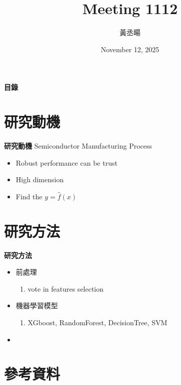 \documentclass[12pt,aspectratio=43]{beamer}
\title{Meeting 1112}
\author{黃丞暘}
\institute{國立東華大學應數統計所}
\date{November 12, 2025}
\begin{document}
\begin{frame}
  \titlepage
\end{frame}

\begin{frame}{\textbf{目錄}}
  \tableofcontents
\end{frame}

\section{研究動機}

\begin{frame}{\textbf{研究動機}}
\linespread{1.5}
  Semiconductor Manufacturing Process
  \begin{itemize}
    \item Robust performance can be trust
  \end{itemize}
  \begin{itemize}
    \item High dimension
  \end{itemize}
  \begin{itemize}
    \item Find the $y = \hat{f}(x)$
  \end{itemize}
\end{frame}

\section{研究方法}
\begin{frame}{\textbf{研究方法}}
\linespread{1.5}
  \begin{itemize}[]
    \item 前處理
      \begin{enumerate}[]
        \item vote in features selection
      \end{enumerate}
    \item 機器學習模型
      \begin{enumerate}[]
        \item XGboost, RandomForest, DecisionTree, SVM
      \end{enumerate}
    \item 
  \end{itemize}
\end{frame}

\section{參考資料}
\end{document}
